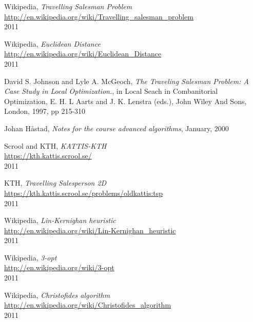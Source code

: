 Wikipedia,
\emph{Travelling Salesman Problem} \\
\url{http://en.wikipedia.org/wiki/Travelling_salesman_problem} \\
2011

Wikipedia,
\emph{Euclidean Distance} \\
\url{http://en.wikipedia.org/wiki/Euclidean_Distance} \\
2011

David S. Johnson and Lyle A. McGeoch,
\emph{The Traveling Salesman Problem: A Case Study in Local Optimization.},
in Local Seach in Combanitorial Optimization,
E. H. L Aarts and J. K. Lenstra (eds.),
John Wiley And Sons,
London,
1997,
pp 215-310

Johan H\r{a}stad,
\emph{Notes for the course advanced algorithms},
January, 2000

Scrool and KTH,
\emph{KATTIS-KTH} \\
\url{https://kth.kattis.scrool.se/} \\
2011

KTH,
\emph{Travelling Salesperson 2D} \\
\url{https://kth.kattis.scrool.se/problems/oldkattis:tsp} \\
2011

Wikipedia,
\emph{Lin-Kernighan heuristic} \\
\url{http://en.wikipedia.org/wiki/Lin-Kernighan_heuristic} \\
2011

Wikipedia,
\emph{3-opt} \\
\url{http://en.wikipedia.org/wiki/3-opt} \\
2011

Wikipedia,
\emph{Christofides algorithm} \\
\url{http://en.wikipedia.org/wiki/Christofides_algorithm} \\
2011
